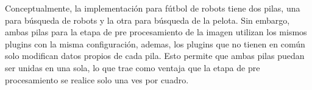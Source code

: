Conceptualmente, la implementación para fútbol de robots tiene dos pilas, una
para búsqueda de robots y la otra para búsqueda de la pelota. Sin embargo, ambas
pilas para la etapa de pre procesamiento de la imagen utilizan los mismos
plugins con la misma configuración, ademas, los plugins que no tienen en común
solo modifican datos propios de cada pila. Esto permite que ambas pilas puedan
ser unidas en una sola, lo que trae como ventaja que la etapa de pre
procesamiento se realice solo una ves por cuadro.
